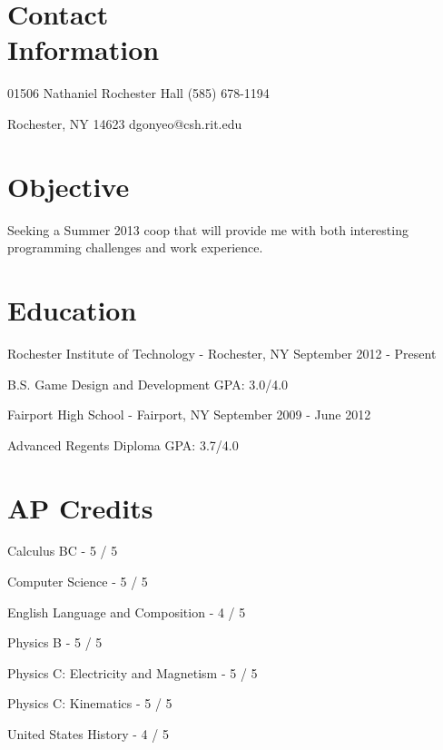 \documentclass[letterpaper,margin,line,11pt]{resume}
\newcommand{\rdate}[1]{\hfill {\small #1}}
\begin{document}
\begin{resume}
\section{\mysidestyle Contact \\ Information} 
	\begin{asparablank}
		\item 01506 Nathaniel Rochester Hall \hfill (585) 678-1194
		\item Rochester, NY 14623 \hfill dgonyeo@csh.rit.edu
	\end{asparablank}

\section{\mysidestyle Objective}
	Seeking a Summer 2013 coop that will provide me with both interesting programming challenges and work experience.

\section{\mysidestyle Education}
	\begin{compactdesc}
		\item[Rochester Institute of Technology] - Rochester, NY \rdate{September 2012 - Present}
		\begin{compactitem} { \small
			\item B.S. Game Design and Development \hfill GPA: 3.0/4.0 \\
		} \end{compactitem}
                \item[Fairport High School] - Fairport, NY \rdate{September 2009 - June 2012}
                \begin{compactitem} {\small
                        \item Advanced Regents Diploma \hfill GPA: 3.7/4.0
                } \end{compactitem}
	\end{compactdesc}

\section{\mysidestyle AP Credits}
        \begin{compactitem}
                \item Calculus BC - {\small 5 / 5}
                \item Computer Science - {\small 5 / 5}
                \item English Language and Composition - {\small 4 / 5}
                \item Physics B - {\small 5 / 5}
                \item Physics C: Electricity and Magnetism - {\small 5 / 5}
                \item Physics C: Kinematics - {\small 5 / 5}
                \item United States History - {\small 4 / 5}
        \end{compactitem}

\end{resume}
\end{document}
